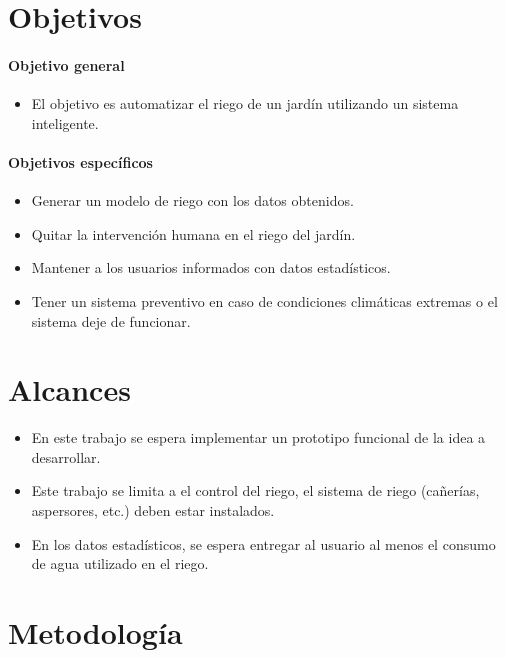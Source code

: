 \documentclass[11pt,letterpaper]{article}
\begin{document}
\section{Objetivos}
\paragraph{Objetivo general}
\begin{itemize}
\item El objetivo es automatizar el riego de un jardín utilizando un sistema inteligente.
\end{itemize}

\paragraph{Objetivos específicos}
\begin{itemize}
\item Generar un modelo de riego con los datos obtenidos.
\item Quitar la intervención humana en el riego del jardín.
\item Mantener a los usuarios informados con datos estadísticos.
\item Tener un sistema preventivo en caso de condiciones climáticas extremas o el sistema deje de funcionar.
\end{itemize}

\section{Alcances}
\begin{itemize}
\item En este trabajo se espera implementar un prototipo funcional de la idea a desarrollar.
\item Este trabajo se limita a el control del riego, el sistema de riego (cañerías, aspersores, etc.) deben estar instalados.
\item En los datos estadísticos, se espera entregar al usuario al menos el consumo de agua utilizado en el riego.
\end{itemize}

\newpage

\section{Metodología}
\end{document}
